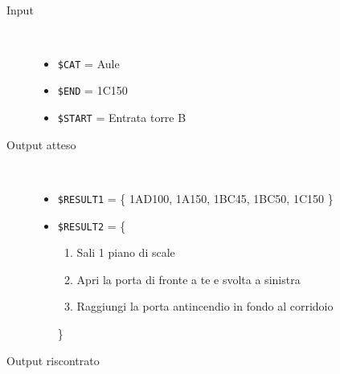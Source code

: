 \documentclass[../../SperimentazioniPratiche.tex]{subfiles}
\begin{document}
			\paragraph*{}
			\label{Prova1A.1}
			\begin{tcolorbox}[fonttitle=\bfseries, 
								adjusted title={\Large Prova 1A.1}, 
								breakable, 
								sharp corners=south,
								colback=white, 
								colframe=white!60!black]
								
				\begin{description}%
				
					\item[Input] \ \par 
        				\begin{itemize}
        					\item \verb|$CAT| = Aule
							\item \verb|$END| = 1C150
							\item \verb|$START| = Entrata torre B
        				\end{itemize}
        				
        			\tcbline 
        				
        			\item[Output atteso] \ \par
        				\begin{itemize}
        				
        					\item \verb|$RESULT1| = \{
        						1AD100, 1A150, 1BC45, 1BC50, 1C150
        					\}
        				
        					\item \verb|$RESULT2| = \{
        					\begin{enumerate}
        						\item Sali 1 piano di scale
								\item Apri la porta di fronte a te e svolta a sinistra
								\item Raggiungi la porta antincendio in fondo al corridoio
        					\end{enumerate}
        					\}
        					
        				\end{itemize}

					\tcbline				
        				
        			\item[Output riscontrato] \ \par
        				\begin{description}
        				

\end{description}
\end{description}
\end{tcolorbox}
\end{document}
